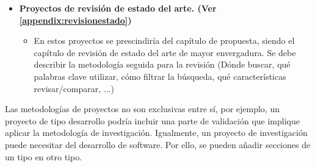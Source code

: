 \begin{itemize}
     \item \textbf{Proyectos de revisión de estado del arte. (Ver \ref{appendix:revisionestado})}
                \begin{itemize}
                    \item En estos proyectos se prescindiría del capítulo de propuesta, siendo el capítulo de revisión de estado del arte de mayor envergadura. Se debe describir la metodología seguida para la revisión (Dónde buscar, qué palabras clave utilizar, cómo filtrar la búsqueda, qué características revisar/comparar, ...)
                \end{itemize}
\end{itemize}

 Las metodologías de proyectos no son exclusivas entre sí, por ejemplo, un proyecto de tipo desarrollo podría incluir una parte de validación que implique aplicar la metodología de investigación. Igualmente, un proyecto de investigación puede necesitar del desarrollo de software. Por ello, se pueden añadir secciones de un tipo en otro tipo.


